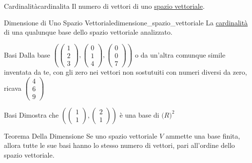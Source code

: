 \documentclass{article}
\begin{document}
\begin{definition}{Cardinalità}{cardinalita}
    Il numero di vettori di uno \hyperref[def:spazio_vettoriale]{spazio vettoriale}.
\end{definition}

\begin{definition}{Dimensione di Uno Spazio Vettoriale}{dimensione_spazio_vettoriale}
    La \hyperref[def:cardinalita]{cardinalità} di una qualunque base dello spazio vettoriale analizzato.
\end{definition}

\begin{exercise}{Basi}{}
    Dalla base $(\begin{pmatrix}
            1 \\
            2 \\
            3
            \end{pmatrix}, \begin{pmatrix}
            0 \\
            1 \\
            4
            \end{pmatrix}, \begin{pmatrix}
            0 \\
            0 \\
            7
            \end{pmatrix})$ o da un'altra comunque simile inventata da te, con gli zero nei vettori non sostutuiti con numeri diversi da zero, ricava $\begin{pmatrix}
            4 \\
            6 \\
            9
            \end{pmatrix}$
\end{exercise}

\begin{exercise}{Basi}{}
    Dimostra che
    $(\begin{pmatrix}
        1 \\
        1 
    \end{pmatrix}, \begin{pmatrix}
        2 \\
        1 
    \end{pmatrix})$ è una base di $\mathbb(R)^2$
\end{exercise}

\begin{theorem}{Teorema Della Dimensione}{}
    Se uno spazio vettoriale $V$ ammette una base finita, allora tutte le sue basi hanno lo stesso numero di vettori, pari all'ordine dello spazio vettoriale.
\end{theorem}
\end{document}

